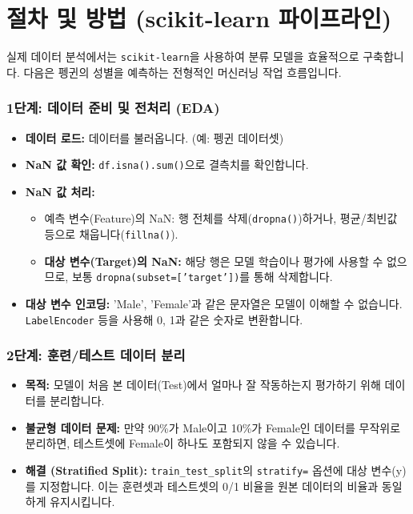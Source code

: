 \documentclass[11pt,a4paper]{book}
\theoremstyle{definition}
\begin{document}
\section{절차 및 방법 (scikit-learn 파이프라인)}

실제 데이터 분석에서는 \texttt{scikit-learn}을 사용하여 분류 모델을 효율적으로 구축합니다. 다음은 펭귄의 성별을 예측하는 전형적인 머신러닝 작업 흐름입니다.

\subsubsection*{1단계: 데이터 준비 및 전처리 (EDA)}
\begin{itemize}
    \item \textbf{데이터 로드:} 데이터를 불러옵니다. (예: 펭귄 데이터셋)
    \item \textbf{NaN 값 확인:} \texttt{df.isna().sum()}으로 결측치를 확인합니다.
    \item \textbf{NaN 값 처리:}
    \begin{itemize}
        \item 예측 변수(Feature)의 NaN: 행 전체를 삭제(\texttt{dropna()})하거나, 평균/최빈값 등으로 채웁니다(\texttt{fillna()}).
        \item \textbf{대상 변수(Target)의 NaN:} 해당 행은 모델 학습이나 평가에 사용할 수 없으므로, 보통 \texttt{dropna(subset=['target'])}를 통해 삭제합니다.
    \end{itemize}
    \item \textbf{대상 변수 인코딩:} 'Male', 'Female'과 같은 문자열은 모델이 이해할 수 없습니다. \texttt{LabelEncoder} 등을 사용해 0, 1과 같은 숫자로 변환합니다.
\end{itemize}

\subsubsection*{2단계: 훈련/테스트 데이터 분리}
\begin{itemize}
    \item \textbf{목적:} 모델이 처음 본 데이터(Test)에서 얼마나 잘 작동하는지 평가하기 위해 데이터를 분리합니다.
    \item \textbf{불균형 데이터 문제:} 만약 90\%가 Male이고 10\%가 Female인 데이터를 무작위로 분리하면, 테스트셋에 Female이 하나도 포함되지 않을 수 있습니다.
    \item \textbf{해결 (Stratified Split):} \texttt{train\_test\_split}의 \texttt{stratify=} 옵션에 대상 변수(y)를 지정합니다. 이는 훈련셋과 테스트셋의 0/1 비율을 원본 데이터의 비율과 동일하게 유지시킵니다.
\end{itemize}
\end{document}

